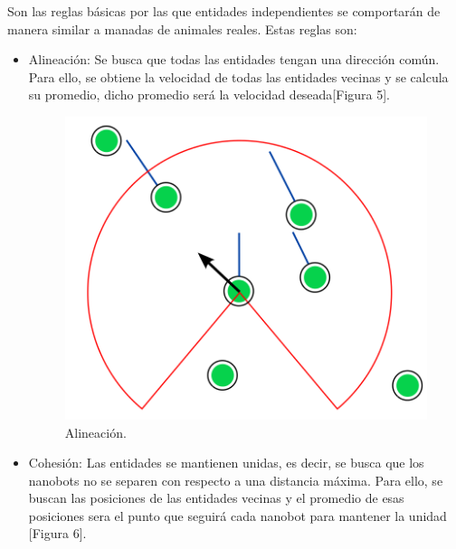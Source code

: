 Son las reglas básicas por las que entidades independientes se comportarán de manera similar a manadas de animales reales. Estas reglas son:
\begin{itemize}
 \item Alineación: Se busca que todas las entidades tengan una dirección común. Para ello, se obtiene la velocidad de todas las entidades vecinas y se calcula su promedio, dicho promedio será la velocidad deseada[Figura 5].
 
  \begin{figure}[h]
 \centering
 \includegraphics[scale=0.2]{../images/alineacion.png}
 \caption{Alineación.}
 \label{fig:../images/flee.png}
 \end{figure}
 
 \item Cohesión: Las entidades se mantienen unidas, es decir, se busca que los nanobots no se separen con respecto a una distancia máxima. Para ello, se buscan las posiciones de las entidades vecinas y el promedio de esas posiciones sera el punto que seguirá cada nanobot para mantener la unidad [Figura 6].
 

\end{itemize}
